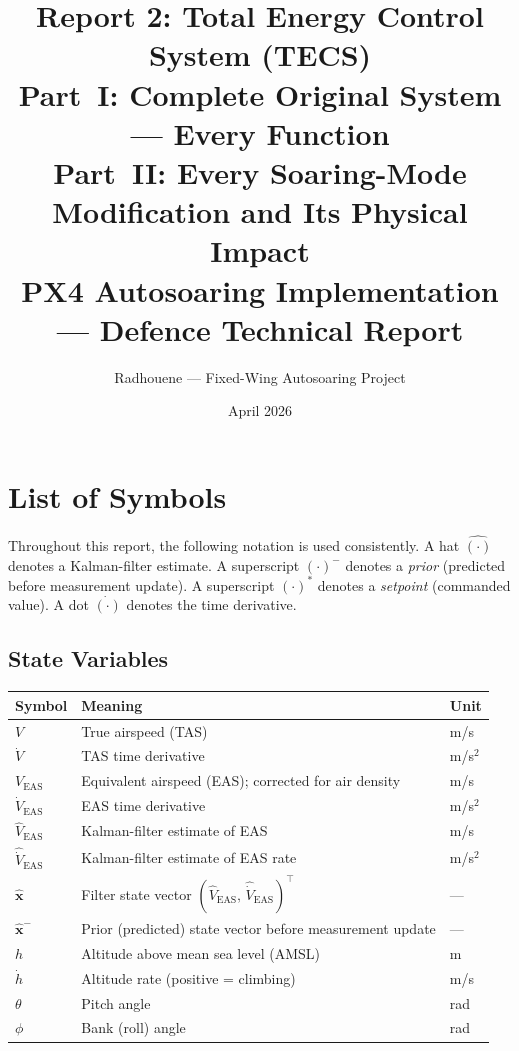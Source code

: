 \documentclass[12pt,a4paper]{article}
\title{\textbf{Report 2: Total Energy Control System (TECS)}\\[0.4em]
\large \textbf{Part~I:} Complete Original System --- Every Function\\
\textbf{Part~II:} Every Soaring-Mode Modification and Its Physical Impact\\[0.5em]
\normalsize PX4 Autosoaring Implementation --- Defence Technical Report}
\author{Radhouene --- Fixed-Wing Autosoaring Project}
\date{April 2026}
\begin{document}
\maketitle
\tableofcontents
\newpage

\section*{List of Symbols}

Throughout this report, the following notation is used consistently.
A hat $\hat{(\cdot)}$ denotes a Kalman-filter estimate.
A superscript $(\cdot)^-$ denotes a \emph{prior} (predicted before measurement update).
A superscript $(\cdot)^*$ denotes a \emph{setpoint} (commanded value).
A dot $\dot{(\cdot)}$ denotes the time derivative.

\subsection*{State Variables}
\begin{center}\begin{tabular}{lll}\toprule
Symbol & Meaning & Unit \\\midrule
$V$ & True airspeed (TAS) & m/s \\
$\dot{V}$ & TAS time derivative & m/s$^2$ \\
$V_{\text{EAS}}$ & Equivalent airspeed (EAS); corrected for air density & m/s \\
$\dot{V}_{\text{EAS}}$ & EAS time derivative & m/s$^2$ \\
$\hat{V}_{\text{EAS}}$ & Kalman-filter estimate of EAS & m/s \\
$\hat{\dot{V}}_{\text{EAS}}$ & Kalman-filter estimate of EAS rate & m/s$^2$ \\
$\hat{\mathbf{x}}$ & Filter state vector $(\hat{V}_{\text{EAS}},\,\hat{\dot{V}}_{\text{EAS}})^\top$ & --- \\
$\hat{\mathbf{x}}^-$ & Prior (predicted) state vector before measurement update & --- \\
$h$ & Altitude above mean sea level (AMSL) & m \\
$\dot{h}$ & Altitude rate (positive = climbing) & m/s \\
$\theta$ & Pitch angle & rad \\
$\phi$ & Bank (roll) angle & rad \\
\bottomrule\end{tabular}\end{center}
\end{document}
